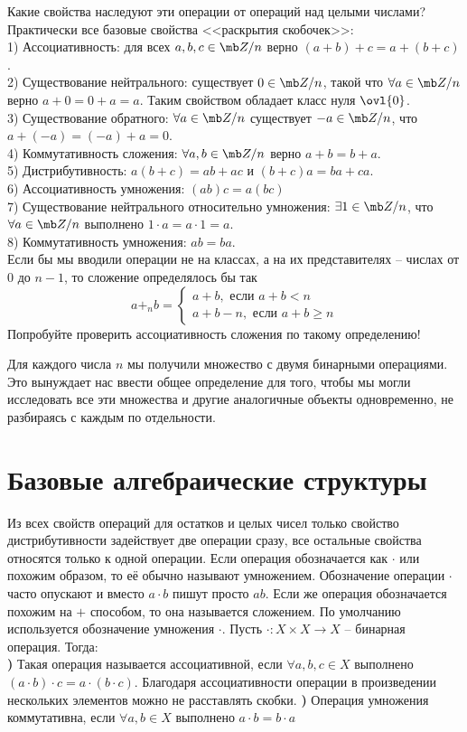 Какие свойства наследуют эти операции от операций над целыми числами? Практически все базовые свойства <<раскрытия скобочек>>:\\
1) Ассоциативность: для всех $a,b,c \in \mb Z/n$ верно $(a+b)+c=a+(b+c)$.\\
2) Существование нейтрального: существует $0\in \mb Z/n$, такой что $\forall a \in \mb Z/n$ верно $a+0=0+a=a$. Таким свойством обладает класс нуля  $\ovl{0}$.\\
3) Существование обратного: $\forall a \in \mb Z/n$ существует $-a \in \mb Z/n$, что $a+(-a)=(-a)+a=0$.\\
4) Коммутативность сложения: $\forall a,b \in \mb Z/n$ верно $a+b=b+a$.\\
5) Дистрибутивность: $a(b+c)=ab+ac$ и $(b+c)a=ba+ca$.\\
6) Ассоциативность умножения: $(ab)c=a(bc)$\\
7) Существование нейтрального относительно умножения: $\exists 1 \in \mb Z/n$, что $\forall a \in \mb Z/n$ выполнено $1\cdot a= a\cdot 1=a$.\\
8) Коммутативность умножения: $ab=ba$.\\

\rm Если бы мы вводили операции не на классах, а на их представителях -- числах от $0$ до $n-1$, то сложение определялось бы так 
$$a+_n b = \begin{cases}a+b, \text{ если } a+b<n\\
a+b-n, \text{ если } a+b\geq n
\end{cases}$$
Попробуйте проверить ассоциативность сложения по такому определению!
\erm

Для каждого числа $n$ мы получили множество с двумя бинарными операциями. Это вынуждает нас ввести общее определение для того, чтобы мы могли исследовать все эти множества и другие аналогичные объекты одновременно, не разбираясь с каждым по отдельности.






\chapter{Базовые алгебраические структуры}

Из всех свойств операций для остатков и целых чисел только свойство дистрибутивности задействует две операции сразу, все остальные свойства относятся только к одной операции. 
\rm Если операция обозначается как $\cdot$ или похожим образом, то её обычно называют умножением. Обозначение операции $\cdot$ часто опускают и вместо $a\cdot b$ пишут просто $ab$. Если же операция обозначается похожим на $+$ способом, то она называется сложением. По умолчанию используется обозначение умножения $\cdot$.
\erm
Пусть $\cdot\colon X \times X \to X$ -- бинарная операция.
Тогда:\\
{\bf{})} Такая операция  называется ассоциативной, если $\forall a,b,c\in X$ выполнено $(a\cdot b) \cdot c=a\cdot (b \cdot c)$.
\rm
Благодаря ассоциативности операции в произведении нескольких элементов можно не расставлять скобки.
\erm
{\bf{})} Операция умножения коммутативна, если $\forall a,b \in X$ выполнено $a\cdot b= b\cdot a$

